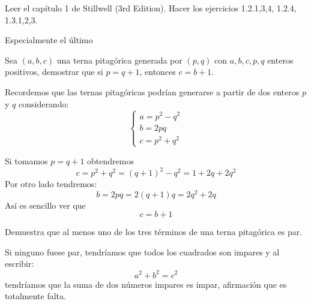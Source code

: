 \begin{problem}[9]
Leer el capítulo 1 de Stillwell (3rd Edition). Hacer los ejercicios 1.2.{1,3,4}, 1.2.4, 1.3.{1,2,3}.

Especialmente el último

\solution

\end{problem}

\begin{problem}[10]
Sea $(a,b,c)$ una terna pitagórica generada por $(p,q)$ con $a,b,c,p,q$ enteros positivos, demostrar que si $p=q+1$, entonces $c=b+1$.

\solution
{}

Recordemos que las ternas pitagóricas podrían generarse a partir de dos enteros $p$ y $q$ considerando:
\[\left\{ \begin{array}{l} a=p^2-q^2 \\ b=2pq \\ c=p^2+q^2 \end{array} \right.\]

Si tomamos $p=q+1$ obtendremos
\[c=p^2+q^2=(q+1)^2-q^2=1+2q+2q^2\]
Por otro lado tendremos:
\[b=2pq=2(q+1)q=2q^2+2q\]
Así es sencillo ver que
\[c=b+1\]
\end{problem}

\begin{problem}[11]
Demuestra que al menos uno de los tres términos de una terna pitagórica es par.

\solution


Si ninguno fuese par, tendríamos que todos los cuadrados son impares y al escribir:
\[a^2+b^2=c^2\]
tendríamos que la suma de dos números impares es impar, afirmación que es totalmente falta.
\end{problem}


